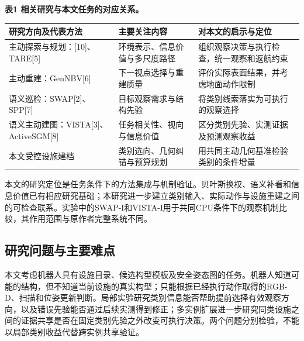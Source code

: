 \documentclass[11pt,a4paper]{article}
\newlength{\ReviewTableWidth}
\numberwithin{equation}{section}
\begin{document}
\par\noindent\begin{minipage}{\linewidth}
\textbf{表1 相关研究与本文任务的对应关系。}

\begin{center}
\small
\setlength{\tabcolsep}{4pt}
\setlength{\ReviewTableWidth}{\dimexpr\linewidth-4\tabcolsep\relax}
\begin{tabular}{@{}>{\raggedright\arraybackslash}p{0.28\ReviewTableWidth} >{\raggedright\arraybackslash}p{0.36\ReviewTableWidth} >{\raggedright\arraybackslash}p{0.36\ReviewTableWidth}@{}}
\toprule
研究方向及代表方法 & 主要关注内容 & 对本文的启示与定位 \\
\midrule
主动探索与规划：{[}10{]}、TARE{[}5{]} & 环境表示、信息价值与多尺度路径 & 组织观察决策与执行检查，统一观察和返航约束 \\
主动重建：GenNBV{[}6{]} & 下一视点选择与重建质量 & 评价实际表面结果，并考虑地面动作限制 \\
语义巡检：SWAP{[}2{]}、SPP{[}7{]} & 目标观察需求与结构先验 & 将类别线索落实为可执行的观察选择 \\
语义主动建图：VISTA{[}3{]}、ActiveSGM{[}8{]} & 任务相关性、视向与信息价值 & 区分类别先验、实测证据及预测观察收益 \\
本文受控设施建档 & 类别选向、几何纠错与预算规划 & 用共同主动几何基准检验类别的条件增量 \\
\bottomrule
\end{tabular}
\end{center}
\end{minipage}


本文的研究定位是任务条件下的方法集成与机制验证。贝叶斯换权、语义补看和信息价值已有相应研究基础；本研究进一步建立类别输入、实际动作与设施重建之间的可检查联系。实验中的SWAP-I和VISTA-I用于共同CPU条件下的观察机制比较，其作用范围与原作者完整系统不同。

\hypertarget{ux7814ux7a76ux95eeux9898ux4e0eux4e3bux8981ux96beux70b9}{%
\subsection{研究问题与主要难点}\label{ux7814ux7a76ux95eeux9898ux4e0eux4e3bux8981ux96beux70b9}}

本文考虑机器人具有设施目录、候选构型模板及安全姿态图的任务。机器人知道可能的结构，但不知道当前设施的真实构型；只能根据已经执行动作取得的RGB-D、扫描和位姿更新判断。局部实验研究类别信息能否帮助提前选择有效观察方向，以及错误先验能否通过后续实测得到修正；多实例扩展进一步研究同类设施之间的证据共享是否在固定类别先验之外改变可执行决策。两个问题分别检验，不能以局部类别收益代替跨实例共享验证。
\end{document}
